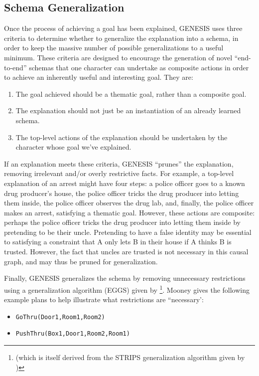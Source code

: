 \subsection{Schema Generalization}

Once the process of achieving a goal has been explained, GENESIS uses three criteria to determine whether to generalize the explanation into a schema, in order to keep the massive number of possible generalizations to a useful minimum. These criteria are designed to encourage the generation of novel ``end-to-end'' schemas that one character can undertake as composite actions in order to achieve an inherently useful and interesting goal. They are:

\begin{enumerate}
    \item The goal achieved should be a thematic goal, rather than a composite goal.
    \item The explanation should not just be an instantiation of an already learned schema.
    \item The top-level actions of the explanation should be undertaken by the character whose goal we've explained.
\end{enumerate}

If an explanation meets these criteria, GENESIS ``prunes'' the explanation, removing irrelevant and/or overly restrictive facts. For example, a top-level explanation of an arrest might have four steps: a police officer goes to a known drug producer's house, the police officer tricks the drug producer into letting them inside, the police officer observes the drug lab, and, finally, the police officer makes an arrest, satisfying a thematic goal. However, these actions are composite: perhaps the police officer tricks the drug producer into letting them inside by pretending to be their uncle. Pretending to have a false identity may be essential to satisfying a constraint that A only lets B in their house if A thinks B is trusted. However, the fact that uncles are trusted is not necessary in this causal graph, and may thus be pruned for generalization.

Finally, GENESIS generalizes the schema by removing unnecessary restrictions using a generalization algorithm (EGGS) given by \citep{mooney:phd88} \footnote{(which is itself derived from the STRIPS generalization algorithm given by \citep{fikes1972})}. Mooney gives the following example plans to help illustrate what restrictions are ``necessary':

\begin{itemize}
    \item \texttt{GoThru(Door1,Room1,Room2)}
    \item \texttt{PushThru(Box1,Door1,Room2,Room1)}
\end{itemize}

